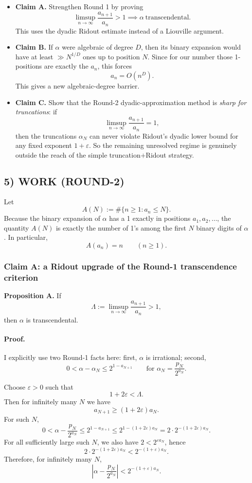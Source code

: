 \begin{itemize}
\item \textbf{Claim A.} Strengthen Round 1 by proving
\[
\limsup_{n\to\infty}\frac{a_{n+1}}{a_n}>1
\implies
\alpha\ \text{transcendental}.
\]
This uses the dyadic Ridout estimate instead of a Liouville argument.

\item \textbf{Claim B.} If $\alpha$ were algebraic of degree $D$, then its binary expansion would have at least $\gg N^{1/D}$ ones up to position $N$. Since for our number those 1-positions are exactly the $a_n$, this forces
\[
a_n=O(n^D).
\]
This gives a new algebraic-degree barrier.

\item \textbf{Claim C.} Show that the Round-2 dyadic-approximation method is \emph{sharp for truncations}: if
\[
\limsup_{n\to\infty}\frac{a_{n+1}}{a_n}=1,
\]
then the truncations $\alpha_N$ can never violate Ridout's dyadic lower bound for any fixed exponent $1+\varepsilon$. So the remaining unresolved regime is genuinely outside the reach of the simple truncation$+$Ridout strategy.
\end{itemize}

\subsection*{5) WORK (ROUND-2)}
Let
\[
A(N):=\#\{n\ge 1: a_n\le N\}.
\]
Because the binary expansion of $\alpha$ has a 1 exactly in positions $a_1,a_2,\dots$, the quantity $A(N)$ is exactly the number of 1's among the first $N$ binary digits of $\alpha$. In particular,
\[
A(a_n)=n\qquad(n\ge 1).
\]

\subsubsection*{Claim A: a Ridout upgrade of the Round-1 transcendence criterion}
\textbf{Proposition A.}
If
\[
\Lambda:=\limsup_{n\to\infty}\frac{a_{n+1}}{a_n}>1,
\]
then $\alpha$ is transcendental.

\paragraph{Proof.}
I explicitly use two Round-1 facts here: first, $\alpha$ is irrational; second,
\[
0<\alpha-\alpha_N\le 2^{1-a_{N+1}}
\qquad\text{for }\alpha_N=\frac{p_N}{2^{a_N}}.
\]

Choose $\varepsilon>0$ such that
\[
1+2\varepsilon<\Lambda.
\]
Then for infinitely many $N$ we have
\[
a_{N+1}\ge (1+2\varepsilon)a_N.
\]
For such $N$,
\[
0<\alpha-\frac{p_N}{2^{a_N}}
\le 2^{1-a_{N+1}}
\le 2^{1-(1+2\varepsilon)a_N}
=2\cdot 2^{-(1+2\varepsilon)a_N}.
\]
For all sufficiently large such $N$, we also have $2<2^{\varepsilon a_N}$, hence
\[
2\cdot 2^{-(1+2\varepsilon)a_N}<2^{-(1+\varepsilon)a_N}.
\]
Therefore, for infinitely many $N$,
\[
\left|\alpha-\frac{p_N}{2^{a_N}}\right|<2^{-(1+\varepsilon)a_N}.
\]

